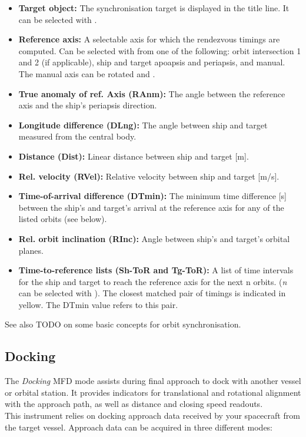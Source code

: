\documentclass[Orbiter User Manual.tex]{subfiles}
\begin{document}
\begin{itemize}
\item \textbf{Target object:} The synchronisation target is displayed in the title line. It can be selected with \Shift{}.
\item \textbf{Reference axis:} A selectable axis for which the rendezvous timings are computed. Can be selected with \Shift{} from one of the following: orbit intersection 1 and 2 (if applicable), ship and target apoapsis and periapsis, and manual. The manual axis can be rotated \Shift\keystroke{,} and \Shift{}.
\item \textbf{True anomaly of ref. Axis (RAnm):} The angle between the reference axis and the ship's periapsis direction.
\item \textbf{Longitude difference (DLng):} The angle between ship and target measured from the central body.
\item \textbf{Distance (Dist):} Linear distance between ship and target [m].
\item \textbf{Rel. velocity (RVel):} Relative velocity between ship and target [m/s].
\item \textbf{Time-of-arrival difference (DTmin):} The minimum time difference [s] between the ship's and target's arrival at the reference axis for any of the listed orbits (see below).
\item \textbf{Rel. orbit inclination (RInc):} Angle between ship's and target's orbital planes.
\item \textbf{Time-to-reference lists (Sh-ToR and Tg-ToR):} A list of time intervals for the ship and target to reach the reference axis for the next n orbits. (\textit{n} can be selected with \Shift{}). The closest matched pair of timings is indicated in yellow. The DTmin value refers to this pair.
\end{itemize}

\noindent
See also TODO on some basic concepts for orbit synchronisation.


\subsection{Docking}
The \textit{Docking} MFD mode assists during final approach to dock with another vessel or orbital station. It provides indicators for translational and rotational alignment with the approach path, as well as distance and closing speed readouts.\\
This instrument relies on docking approach data received by your spacecraft from the target vessel. Approach data can be acquired in three different modes:
\end{document}
